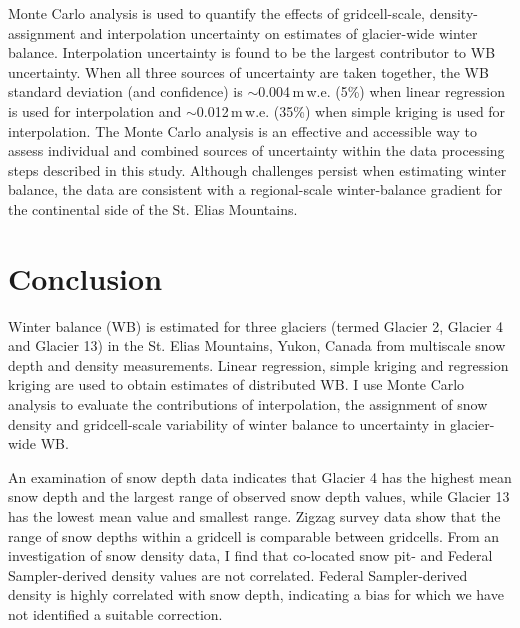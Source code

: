 \documentclass{sfuthesis}
\begin{document}
Monte Carlo analysis is used to quantify the effects of gridcell-scale, density-assignment and interpolation uncertainty on estimates of glacier-wide winter balance. Interpolation uncertainty is found to be the largest contributor to WB uncertainty. When all three sources of uncertainty are taken together, the WB standard deviation (and confidence) is $\sim$0.004\,m\,w.e. (5\%) when linear regression is used for interpolation and $\sim$0.012\,m\,w.e. (35\%) when simple kriging is used for interpolation. The Monte Carlo analysis is an effective and accessible way to assess individual and combined sources of uncertainty within the data processing steps described in this study. Although challenges persist when estimating winter balance, the data are consistent with a regional-scale winter-balance gradient for the continental side of the St. Elias Mountains. 


\chapter{Conclusion}

Winter balance (WB) is estimated for three glaciers (termed Glacier 2, Glacier 4 and Glacier 13) in the St. Elias Mountains, Yukon, Canada from multiscale snow depth and density measurements. Linear regression, simple kriging and regression kriging are used to obtain estimates of distributed WB. I use Monte Carlo analysis to evaluate the contributions of interpolation, the assignment of snow density and gridcell-scale variability of winter balance to uncertainty in glacier-wide WB.

An examination of snow depth data indicates that Glacier 4 has the highest mean snow depth and the largest range of observed snow
depth values, while Glacier 13 has the lowest mean value and smallest range. Zigzag survey data show that the range of snow depths within a gridcell is comparable between gridcells. From an investigation of snow density data, I find that co-located snow pit- and Federal Sampler-derived density values are not correlated. Federal Sampler-derived density is highly correlated with snow depth, indicating a bias for which we have not identified a suitable correction. 
\end{document}
